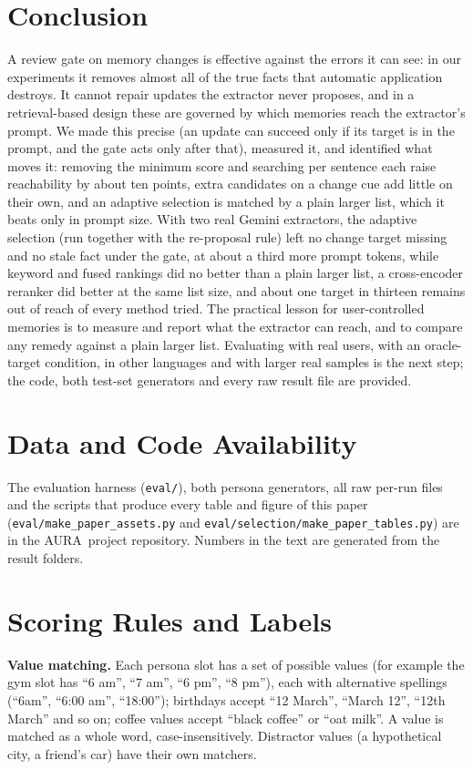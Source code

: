 \IfFileExists{IEEEtran.cls}{\documentclass[journal]{IEEEtran}\def\HAVEIEEE{1}}{\documentclass[10pt,twocolumn]{article}\usepackage[margin=0.7in,columnsep=0.25in]{geometry}}
\providecommand{\appendices}{\appendix}
\newcommand{\aura}{AURA}
\begin{document}
\section{Conclusion}
A review gate on memory changes is effective against the errors it can see: in our experiments it removes almost all of the true facts that automatic application destroys. It cannot repair updates the extractor never proposes, and in a retrieval-based design these are governed by which memories reach the extractor's prompt. We made this precise (an update can succeed only if its target is in the prompt, and the gate acts only after that), measured it, and identified what moves it: removing the minimum score and searching per sentence each raise reachability by about ten points, extra candidates on a change cue add little on their own, and an adaptive selection is matched by a plain larger list, which it beats only in prompt size. With two real Gemini extractors, the adaptive selection (run together with the re-proposal rule) left no change target missing and no stale fact under the gate, at about a third more prompt tokens, while keyword and fused rankings did no better than a plain larger list, a cross-encoder reranker did better at the same list size, and about one target in thirteen remains out of reach of every method tried. The practical lesson for user-controlled memories is to measure and report what the extractor can reach, and to compare any remedy against a plain larger list. Evaluating with real users, with an oracle-target condition, in other languages and with larger real samples is the next step; the code, both test-set generators and every raw result file are provided.

\section*{Data and Code Availability}
The evaluation harness (\texttt{eval/}), both persona generators, all raw per-run files and the scripts that produce every table and figure of this paper (\texttt{eval/make\_paper\_assets.py} and \texttt{eval/selection/make\_paper\_tables.py}) are in the \aura\ project repository. Numbers in the text are generated from the result folders.

\appendices
\FloatBarrier
\section{Scoring Rules and Labels}
\label{app:scoring}
\textbf{Value matching.} Each persona slot has a set of possible values (for example the gym slot has ``6 am'', ``7 am'', ``6 pm'', ``8 pm''), each with alternative spellings (``6am'', ``6:00 am'', ``18:00''); birthdays accept ``12 March'', ``March 12'', ``12th March'' and so on; coffee values accept ``black coffee'' or ``oat milk''. A value is matched as a whole word, case-insensitively. Distractor values (a hypothetical city, a friend's car) have their own matchers.
\end{document}

